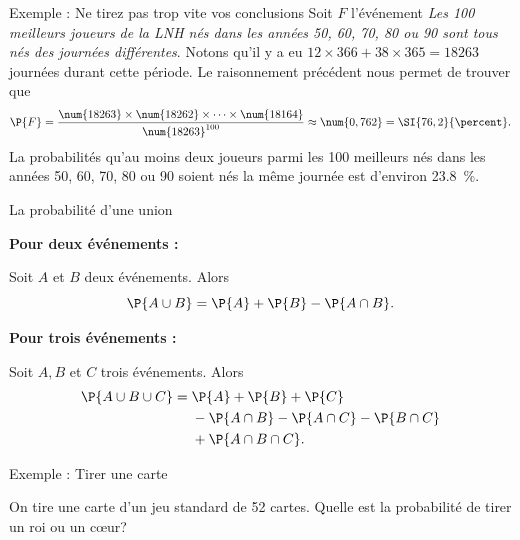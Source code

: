 \documentclass[nuit,charter,pied,handout]{BeamerJS}
\begin{document}
\begin{frame}{Exemple : Ne tirez pas trop vite vos conclusions}
Soit \(F\) l'événement \textit{Les \num{100} meilleurs joueurs de la LNH nés dans les années \num{50}, \num{60}, \num{70}, \num{80} ou \num{90} sont tous nés des journées différentes}. \pause Notons qu'il y a eu \(\num{12}\times \num{366}+\num{38}\times \num{365}=\num{18263}\) journées durant cette période. \pause
Le raisonnement précédent nous permet de trouver que
\[\P{F}=\frac{\num{18263}\times \num{18262}\times\cdots\times \num{18164}}{\num{18263}^{100}}\approx\num{0,762}=\SI{76,2}{\percent}.\]
\pause La probabilités qu'au moins deux joueurs parmi les \num{100} meilleurs nés dans les années \num{50}, \num{60}, \num{70}, \num{80} ou \num{90} soient nés la même journée est d'environ \SI{23,8}{\percent}.
\end{frame}
\begin{frame}{La probabilité d'une union}
\pause
	\begin{props}
	\textbf{Pour deux événements :}
	
	Soit \(A\) et \(B\) deux événements. Alors
	\[\P{A\cup B}=\P{A}+\P{B}-\P{A\cap B}.\]
	
	\pause
	\medskip
	\textbf{Pour trois événements :}
	
	Soit \(A, B\) et \(C\) trois événements. Alors
		\begin{align*}
		\P{A\cup B\cup C}&=\P{A}+\P{B}+\P{C}\\
		&~~~~-\P{A\cap B}-\P{A\cap C}-\P{B\cap C}\\
		&~~~~+\P{A\cap B\cap C}.
		\end{align*}
	\end{props}
\end{frame}
\begin{frame}{Exemple : Tirer une carte}
	\begin{cadre}
	On tire une carte d'un jeu standard de 52 cartes. Quelle est la probabilité de tirer un roi ou un cœur?
	\end{cadre}
\end{frame}
\end{document}
